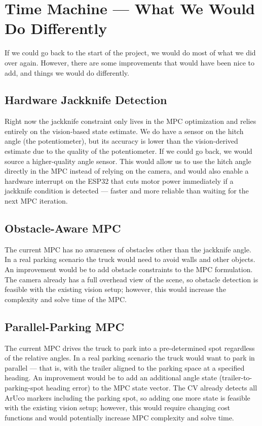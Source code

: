 \documentclass[11pt, letterpaper]{article}
\begin{document}
\section{Time Machine --- What We Would Do Differently}

If we could go back to the start of the project, we would do most of
what we did over again. However, there are some improvements that would
have been nice to add, and things we would do differently.

\subsection{Hardware Jackknife Detection}

Right now the jackknife constraint only lives in the MPC optimization
and relies entirely on the vision-based state estimate. We do have a
sensor on the hitch angle (the potentiometer), but its accuracy is lower
than the vision-derived estimate due to the quality of the
potentiometer. If we could go back, we would source a higher-quality
angle sensor. This would allow us to use the hitch angle directly in the
MPC instead of relying on the camera, and would also enable a hardware
interrupt on the ESP32 that cuts motor power immediately if a jackknife
condition is detected --- faster and more reliable than waiting for the
next MPC iteration.

\subsection{Obstacle-Aware MPC}

The current MPC has no awareness of obstacles other than the jackknife
angle. In a real parking scenario the truck would need to avoid walls
and other objects. An improvement would be to add obstacle constraints
to the MPC formulation. The camera already has a full overhead view of
the scene, so obstacle detection is feasible with the existing vision
setup; however, this would increase the complexity and solve time of the
MPC.

\subsection{Parallel-Parking MPC}

The current MPC drives the truck to park into a pre-determined spot
regardless of the relative angles. In a real parking scenario the truck
would want to park in parallel --- that is, with the trailer aligned to
the parking space at a specified heading. An improvement would be to add
an additional angle state (trailer-to-parking-spot heading error) to the
MPC state vector. The CV already detects all ArUco markers including the
parking spot, so adding one more state is feasible with the existing
vision setup; however, this would require changing cost functions and
would potentially increase MPC complexity and solve time.
\end{document}
